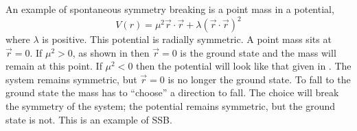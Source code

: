 An example of spontaneous symmetry breaking is a point mass in a potential,
\begin{equation}
V(r) = \mu^{2} \vec{r} \cdot \vec{r} + \lambda ( \vec{r} \cdot \vec{r} )^{2}
\end{equation}
where $\lambda$ is positive. This potential is radially symmetric. 
A point mass sits at $\vec{r}=0$. If $\mu^{2}>0$, as shown in
 then $\vec{r}=0$ is the ground state and
the mass will remain at this point.
If $\mu^{2}<0$ then the potential will look like that given in
. The system remains symmetric, but $\vec{r}=0$ is no longer
the ground state. To fall to the ground state the mass has to ``choose'' a
direction to fall. The choice will break the symmetry of the system; the
potential remains symmetric, but the ground state is not. This is an example of
{SSB}.

